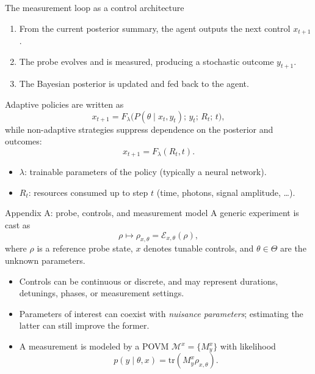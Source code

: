 \documentclass[aspectratio=169]{beamer}
\begin{document}
\begin{frame}{The measurement loop as a control architecture}
\begin{enumerate}
  \item From the current posterior summary, the agent outputs the next control $x_{t+1}$.
  \item The probe evolves and is measured, producing a stochastic outcome $y_{t+1}$.
  \item The Bayesian posterior is updated and fed back to the agent.
\end{enumerate}
\vspace{0.5em}
Adaptive policies are written as
\[
  x_{t+1}=F_{\lambda}\!\big(P(\theta\mid x_t,y_t);\, y_t;\, R_t;\, t\big),
\]
while non-adaptive strategies suppress dependence on the posterior and outcomes:
\[
  x_{t+1}=F_{\lambda}(R_t,t).
\]
\begin{itemize}
  \item $\lambda$: trainable parameters of the policy (typically a neural network).
  \item $R_t$: resources consumed up to step $t$ (time, photons, signal amplitude, \ldots).
\end{itemize}
\end{frame}

\begin{frame}{Appendix A: probe, controls, and measurement model}
A generic experiment is cast as
\[
  \rho \longmapsto \rho_{x,\theta}=\mathcal E_{x,\theta}(\rho),
\]
where $\rho$ is a reference probe state, $x$ denotes tunable controls, and $\theta\in\Theta$ are the unknown parameters.
\vspace{0.6em}
\begin{itemize}
  \item Controls can be continuous or discrete, and may represent durations, detunings, phases, or measurement settings.
  \item Parameters of interest can coexist with \emph{nuisance parameters}; estimating the latter can still improve the former.
  \item A measurement is modeled by a POVM $\mathcal M^x=\{M^x_y\}$ with likelihood
  \[
    p(y\mid \theta,x)=\mathrm{tr}\!\left(M^x_y\rho_{x,\theta}\right).
  \]
\end{itemize}
\end{frame}
\end{document}
